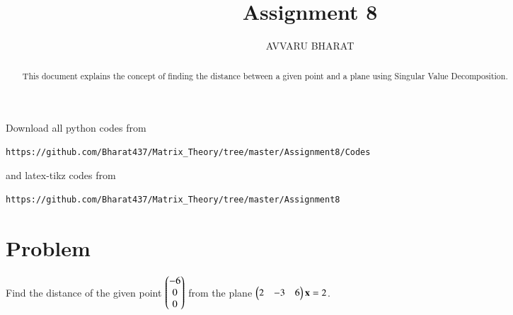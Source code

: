 \documentclass[journal,12pt,twocolumn]{IEEEtran}
\begin{document}
     \def\rightbox#1{\makebox[0in][r]{#1}}
     \def\centbox#1{\makebox[0in]{#1}}
     \def\topbox#1{\raisebox{-\baselineskip}[0in][0in]{#1}}
     \def\midbox#1{\raisebox{-0.5\baselineskip}[0in][0in]{#1}}
\vspace{3cm}
\title{Assignment 8}
\author{AVVARU BHARAT}
\maketitle
\newpage
\bigskip
\renewcommand{\thefigure}{\theenumi}
\renewcommand{\thetable}{\theenumi}
\begin{abstract}
This document explains the concept of finding the distance between a given point and a plane using Singular Value Decomposition.
\end{abstract}
Download all python codes from 
\begin{lstlisting}
https://github.com/Bharat437/Matrix_Theory/tree/master/Assignment8/Codes
\end{lstlisting}
%
and latex-tikz codes from 
%
\begin{lstlisting}
https://github.com/Bharat437/Matrix_Theory/tree/master/Assignment8
\end{lstlisting}
%
\section{Problem}
Find the distance of the given point $\begin{pmatrix}-6\\0\\0\end{pmatrix}$ from the plane $\begin{pmatrix}2&-3&6\end{pmatrix}\mathbf{x} = 2$.
\end{document}
